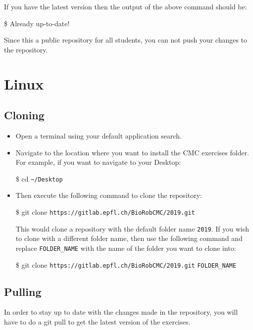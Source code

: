 \documentclass{cmc}
\begin{document}
If you have the latest version then the output of the above command
should be:

\begin{center}
  \$ Already up-to-date!
\end{center}

Since this a public repository for all students, you can not push your
changes to the repository.


\section{Linux}
\label{sec:linux}

\subsection{Cloning}
\label{sec:linux_cloning}
\begin{itemize}
\item Open a terminal using your default application search.
\item Navigate to the location where you want to install the CMC
  exercises folder. For example, if you want to navigate to your
  Desktop:

  \begin{center}
    \$ cd \verb|~/Desktop|
  \end{center}

\item Then execute the following command to clone the repository:
  \begin{center}
    \$ git clone \verb|https://gitlab.epfl.ch/BioRobCMC/2019.git|
  \end{center}

  This would clone a repository with the default folder name
  \verb|2019|. If you wish to clone with a different folder name, then
  use the following command and replace \verb|FOLDER_NAME| with the
  name of the folder you want to clone into:
  \begin{center}
    \$ git clone \verb|https://gitlab.epfl.ch/BioRobCMC/2019.git|
    \verb|FOLDER_NAME|
  \end{center}

\end{itemize}

\subsection{Pulling}
\label{sec:linux_pulling}

In order to stay up to date with the changes made in the repository,
you will have to do a git pull to get the latest version of the
exercises.
\end{document}
